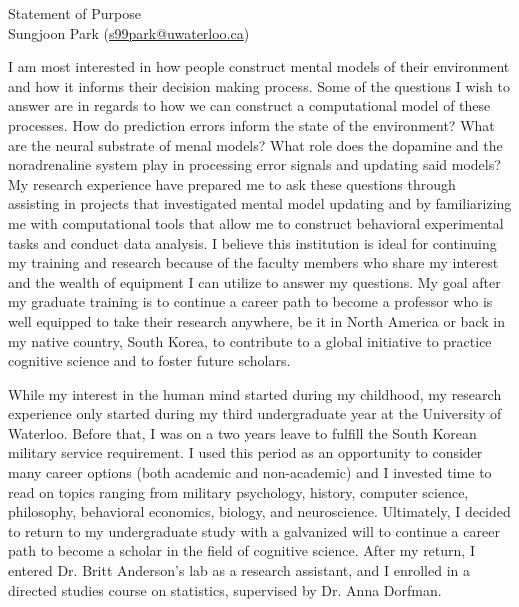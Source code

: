 \documentclass[12pt]{article}
\let\oldcenter\center
\let\oldendcenter\endcenter
\renewenvironment{center}{\setlength\topsep{-1pt}\oldcenter}{\oldendcenter}
\begin{document}
	
	\begin{center}
		{\Large Statement of Purpose} \\
		{\normalsize Sungjoon Park (\href{mailto:s99park@uwaterloo.ca}{s99park@uwaterloo.ca})}
	\end{center}
	
	I am most interested in how people construct mental models of their environment and how it informs their decision making process. Some of the questions I wish to answer are in regards to how we can construct a computational model of these processes. How do prediction errors inform the state of the environment? What are the neural substrate of menal models? What role does the dopamine and the noradrenaline system play in processing error signals and updating said models? My research experience have prepared me to ask these questions through assisting in projects that investigated mental model updating and by familiarizing me with computational tools that allow me to construct behavioral experimental tasks and conduct data analysis. I believe this institution is ideal for continuing my training and research because of the faculty members who share my interest and the wealth of equipment I can utilize to answer my questions. My goal after my graduate training is to continue a career path to become a professor who is well equipped to take their research anywhere, be it in North America or back in my native country, South Korea, to contribute to a global initiative to practice cognitive science and to foster future scholars.
	
	While my interest in the human mind started during my childhood, my research experience only started during my third undergraduate year at the University of Waterloo. Before that, I was on a two years leave to fulfill the South Korean military service requirement. I used this period as an opportunity to consider many career options (both academic and non-academic) and I invested time to read on topics ranging from military psychology, history, computer science, philosophy, behavioral economics, biology, and neuroscience. Ultimately, I decided to return to my undergraduate study with a galvanized will to continue a career path to become a scholar in the field of cognitive science. After my return, I entered Dr. Britt Anderson’s lab as a research assistant, and I enrolled in a directed studies course on statistics, supervised by Dr. Anna Dorfman.
	
\end{document}
